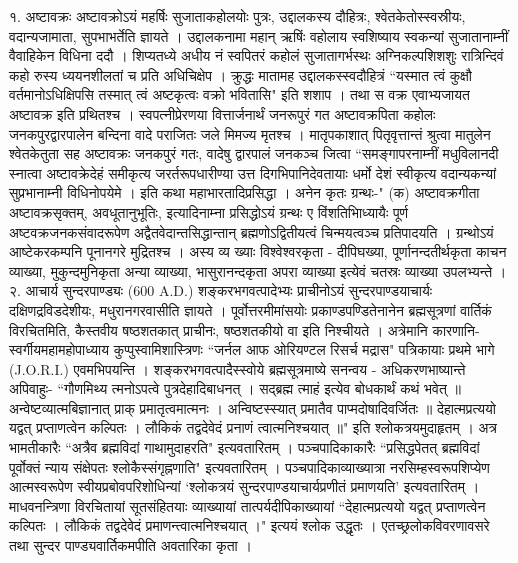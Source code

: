 १. अष्टावक्रः
अष्टावक्रोऽयं महर्षिः सुजाताकहोलयोः पुत्रः, उद्दालकस्य दौहित्रः, श्वेतकेतोस्स्वस्रीयः, वदान्यजामाता, सुपभाभर्तेति ज्ञायते । उद्दालकनामा महान् ऋषिंः वहोलाय स्वशिष्याय स्वकन्यां सुजातानाम्नीं वैवाहिकेन विधिना ददौ । शिप्यतध्ये अधीय नं स्वपितरं कहोलं सुजातागर्भस्थः अग्निकल्पशिशशुः रात्रिन्दिवं कहो रुस्य ध्ययनशीलतां च प्रति अधिचिक्षेप । क्रुद्धः मातामह उद्दालकस्स्वदौहित्रं ``यस्मात त्वं कुक्षौ वर्तमानोऽधिक्षिपसि तस्मात् त्वं अष्टकृत्वः वक्रो भवितासि" इति शशाप । तथा स वक्र एवाभ्यजायत अष्टावक्र इति प्रथितश्च । स्वपत्नीप्रेरणया वित्तार्जनार्थं जनरूपुरं गत अष्टावक्रपिता कहोलः जनकपुरद्वारपालेन बन्दिना वादे पराजितः जले मिमज्य मृतश्च । मातृपकाशात् पितृवृत्तान्तं श्रुत्वा मातुलेन श्वेतकेतुता सह अष्टावक्रः जनकपुरं गतः, वादेषु द्वारपालं जनकञ्च जित्वा ``समङ्गापरनाम्नीं मधुविलानदी स्नात्वा अष्टावक्रेदेहं समीकृत्य जरर्तरूपधारीण्या उत्त दिगभिपानिदेवतायाः धर्मो देशं स्वीकृत्य वदान्यकन्यां सुप्रभानाम्नी विधिनोपयेमे । इति कथा महाभारतादिप्रसिद्धा । अनेन कृतः ग्रन्थः-"
(क) अष्टावक्रगीता
अष्टावक्रसृक्तम्, अवधूतानुभूतिः, इत्यादिनाम्ना प्रसिद्धोऽयं ग्रन्थः ए विंशतिभिाध्यायैः पूर्ण अष्टवक्रजनकसंवादरूपेण अद्वैतवेदान्तसिद्धान्तान् ब्रह्मणोऽद्वितीयत्वं चिन्मयत्वञ्च प्रतिपादयति । ग्रन्थोऽयं आष्टेकरकम्पनि पूनानगरे मुद्रितश्च । अस्य व्य ख्याः विश्वेश्वरकृता - दीपिघख्या, पूर्णानन्दतीर्थकृता काचन व्याख्या, मुकुन्दमुनिकृता अन्या व्याख्या, भासुरानन्दकृता अपरा व्याख्या इत्येवं चतस्रः व्याख्या उपलभ्यन्ते ।
२. आचार्य सुन्दरपाण्ड्यः (600 A.D.)
शङ्करभगवत्पादेभ्यः प्राचीनोऽयं सुन्दरपाण्डयाचार्यः दक्षिणद्रविडदेशीयः, मधुरानगरवासीति ज्ञायते । पूर्वोत्तरमीमांसयोः प्रकाण्डपण्डितेनानेन ब्रह्मसूत्रणां वार्तिकं विरचितमिति, कैस्तवीय षष्ठशतकात् प्राचीनः, षष्ठशतकीयो वा इति निश्चीयते । अत्रेमानि कारणानि-
स्वर्गीयमहामहोपाध्याय कुप्पुस्वामिशास्त्रिणः ``जर्नल आफ ओरियण्टल रिसर्च मद्रास" पत्रिकायाः प्रथमे भागे (J.O.R.I.) एवमभिपयन्ति । शङ्करभगवत्पादैस्स्वोये ब्रह्मसूत्रमाष्ये सनन्वय - अधिकरणभाष्यान्ते अपिवाहुः-
``गौणमिथ्य त्मनोऽपत्वे पुत्रदेहादिबाधनत् ।
सद्ब्रह्म त्माहं इत्येव बोधकार्थं कथं भवेत् ॥
अन्वेष्टव्यात्मबिज्ञानात् प्राक् प्रमातृत्वमात्मनः ।
अन्विष्टस्स्यात् प्रमातैव पाप्मदोषादिवर्जितः ॥
देहात्मप्रत्ययो यद्वत् प्रप्ताणत्वेन कल्पितः ।
लौकिकं तद्वदेवेदं प्रनाणं त्वात्मनिश्चयात् ॥" इति 
श्लोकत्रयमुदाहृतम् । अत्र भामतीकारैः ``अत्रैव ब्रह्मविदां गाथामुदाहरति" इत्यवतारितम् । पञ्चपादिकाकारैः ``प्रसिद्धपेतत् ब्रह्मविदां पूर्वोक्तं न्याय संक्षेपतः श्लोकैस्संगृह्नणाति" इत्यवतारितम् । पञ्चपादिकाव्याख्यात्रा नरसिम्हस्वरूपशिप्येण आत्मस्वरूपेण स्वीयप्रबोवपरिशोधिन्यां `श्लोकत्रयं सुन्दरपाण्डयाचार्यप्रणीतं प्रमाणयति' इत्यवतारितम् ।
माधवनन्त्रिणा विरचितायां सूतसंहितयाः व्याख्यायां तात्पर्यदीपिकाख्यायां ``देहात्मप्रत्ययो यद्वत् प्रप्ताणत्वेन कल्पितः । लौकिकं तद्वदेवेदं प्रमाणन्त्वात्मनिश्चयात् ।" इत्ययं श्लोक उद्धृतः । एतच्छ्रलोकविवरणावसरे तथा सुन्दर पाण्ड्यवार्तिकमपीति अवतारिका कृता । 
